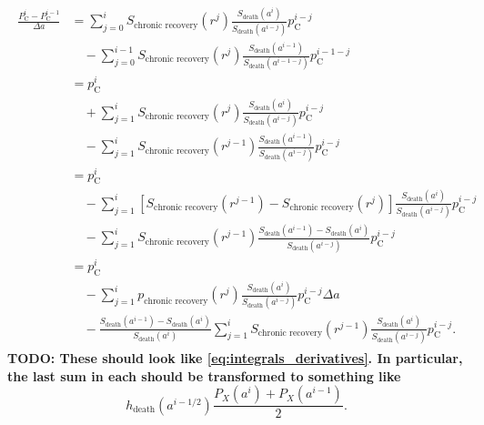 \documentclass[12pt]{article}
\begin{document}
\begin{subequations}
\begin{align}
    \begin{split}
      \frac{P_{\mathrm{C}}^i - P_{\mathrm{C}}^{i - 1}}{\Delta a}
      &=
      \sum_{j = 0}^i S_{\text{chronic recovery}}(r^j)
      \frac{S_{\text{death}}(a^i)}{S_{\text{death}}(a^{i - j})}
      p_{\mathrm{C}}^{i - j}
      \\ & \quad {}
      - \sum_{j = 0}^{i - 1} S_{\text{chronic recovery}}(r^j)
      \frac{S_{\text{death}}(a^{i - 1})}{S_{\text{death}}(a^{i - 1 - j})}
      p_{\mathrm{C}}^{i - 1 - j}
      \\
      &= p_{\mathrm{C}}^i
      \\ & \quad {}
      + \sum_{j = 1}^i S_{\text{chronic recovery}}(r^j)
      \frac{S_{\text{death}}(a^i)}{S_{\text{death}}(a^{i - j})}
      p_{\mathrm{C}}^{i - j}
      \\ & \quad {}
      - \sum_{j = 1}^i S_{\text{chronic recovery}}(r^{j - 1})
      \frac{S_{\text{death}}(a^{i - 1})}{S_{\text{death}}(a^{i - j})}
      p_{\mathrm{C}}^{i - j}
      \\
      &= p_{\mathrm{C}}^i
      \\ & \quad {}
      - \sum_{j = 1}^i
      \left[
        S_{\text{chronic recovery}}(r^{j - 1})
        - S_{\text{chronic recovery}}(r^j)
      \right]
      \frac{S_{\text{death}}(a^i)}{S_{\text{death}}(a^{i - j})}
      p_{\mathrm{C}}^{i - j}
      \\ & \quad {}
      - \sum_{j = 1}^i S_{\text{chronic recovery}}(r^{j - 1})
      \frac{S_{\text{death}}(a^{i - 1}) - S_{\text{death}}(a^i)}
      {S_{\text{death}}(a^{i - j})}
      p_{\mathrm{C}}^{i - j}
      \\
      &= p_{\mathrm{C}}^i
      \\ & \quad {}
      - \sum_{j = 1}^i p_{\text{chronic recovery}}(r^j)
      \frac{S_{\text{death}}(a^i)}{S_{\text{death}}(a^{i - j})}
      p_{\mathrm{C}}^{i - j} \Delta a
      \\ & \quad {}
      - \frac{S_{\text{death}}(a^{i - 1}) - S_{\text{death}}(a^i)}
      {S_{\text{death}}(a^i)}
      \sum_{j = 1}^i S_{\text{chronic recovery}}(r^{j - 1})
      \frac{S_{\text{death}}(a^i)}{S_{\text{death}}(a^{i - j})}
      p_{\mathrm{C}}^{i - j}.
    \end{split}
  \end{align}
\end{subequations}
%
\textbf{TODO: These should look like
  \eqref{eq:integrals_derivatives}. In particular, the last sum in
  each should be transformed to something like}
$$h_{\text{death}}(a^{i - 1 / 2})
\frac{P_X(a^i) + P_X(a^{i - 1})}{2}.$$
%
\end{document}
